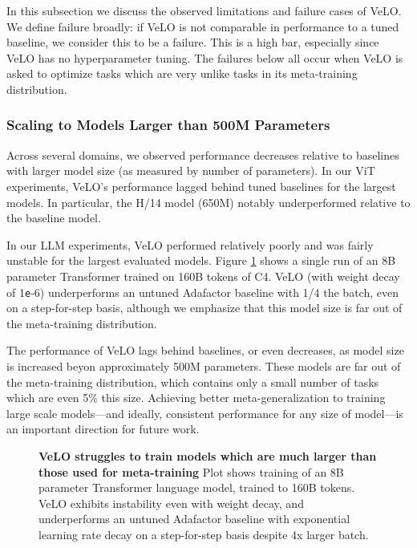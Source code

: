\documentclass[11pt]{article}
\newcommand{\e}{\texttt{e}}
\begin{document}
In this subsection we discuss the observed limitations and failure cases of VeLO. We define failure broadly: if VeLO is not comparable in performance to a tuned baseline, we consider this to be a failure. 
This is a high bar, especially since VeLO has no hyperparameter tuning.
The failures below all occur when VeLO is asked to optimize tasks which are very unlike tasks in its meta-training distribution. 

\subsubsection{Scaling to Models Larger than 500M Parameters}

Across several domains, we observed performance decreases relative to baselines with larger model size (as measured by number of parameters). In our ViT experiments, VeLO's performance lagged behind tuned baselines for the largest models. In particular, the H/14 model (650M) notably underperformed relative to the baseline model. 

In our LLM experiments, VeLO performed relatively poorly and was fairly unstable for the largest evaluated models. Figure \ref{fig:8b_transformer} shows a single run of an 8B parameter Transformer trained on 160B tokens of C4. VeLO (with weight decay of 1\e-6) underperforms an untuned Adafactor baseline with 1/4 the batch, even on a step-for-step basis, although we emphasize that this model size is far out of the meta-training distribution.

The performance of VeLO lags behind baselines, or even decreases, as model size is increased beyon approximately 500M parameters. These models are far out of the meta-training distribution, which contains only a small number of tasks which are even 
5\% this size. 
Achieving better meta-generalization to training large scale models---and ideally, consistent performance for any size of model---is an important direction for future work. 


\begin{figure}[!t]
    \begin{minipage}[c]{0.625\textwidth}
    \centering
    \end{minipage}\hfill
    \begin{minipage}[c]{0.375\textwidth}
    \caption{
    \textbf{VeLO struggles to train models which are much larger than those used for meta-training} Plot shows training of an 8B parameter Transformer language model, trained to 160B tokens. VeLO exhibits instability even with weight decay, and underperforms an untuned Adafactor baseline with exponential learning rate decay on a step-for-step basis despite 4x larger batch.
    \label{fig:8b_transformer}
    }
    \end{minipage}
\end{figure}
\end{document}
